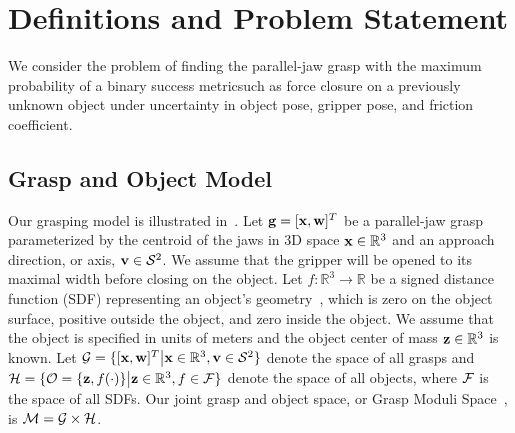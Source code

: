 \section{Definitions and Problem Statement}

We consider the problem of finding the parallel-jaw grasp with the maximum probability of a binary success metricsuch as force closure on a previously unknown object under uncertainty in object pose, gripper pose, and friction coefficient.

\subsection{Grasp and Object Model}
Our grasping model is illustrated in~.
Let $\mathbf{g} = [\mathbf{x}, \mathbf{w}]^T$ be a parallel-jaw grasp parameterized by the centroid of the jaws in 3D space $\mathbf{x} \in \mathbb{R}^3$ and an approach direction, or axis, $\mathbf{v} \in \mathcal{S}^2$.
We assume that the gripper will be opened to its maximal width before closing on the object.
Let $f: \mathbb{R}^3 \rightarrow \mathbb{R}$ be a signed distance function (SDF) representing an object's geometry~\cite{newcombe2011kinectfusion, mahler2015gp}, which is zero on the object surface, positive outside the object, and zero inside the object. 
We assume that the object is specified in units of meters and the object center of mass $\mathbf{z} \in \mathbb{R}^3$ is known.
Let $\mathcal{G} = \{ [\mathbf{x}, \mathbf{w}]^T \big| \mathbf{x} \in \mathbb{R}^3, \mathbf{v} \in \mathcal{S}^2\}$ denote the space of all grasps and $\mathcal{H} = \{ \mathcal{O} = \{\mathbf{z}, f(\cdot)\} \big|  \mathbf{z} \in \mathbb{R}^3, f \in \mathcal{F}\}$ denote the space of all objects, where $\mathcal{F}$ is the space of all SDFs.
Our joint grasp and object space, or Grasp Moduli Space~\cite{pokorny2013grasp}, is $\mathcal{M} = \mathcal{G} \times \mathcal{H}$.

